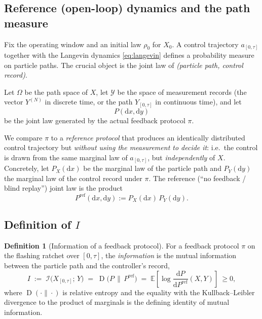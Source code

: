 \documentclass{amsart}
\theoremstyle{definition}
\newtheorem{definition}{Definition}
\newcommand{\E}{\mathbb{E}}
\newcommand{\dd}{\mathrm{d}}
\DeclareMathOperator{\KL}{D}
\begin{document}
\subsection{Reference (open-loop) dynamics and the path measure}
Fix the operating window and an initial law $\rho_0$ for $X_0$. A control
trajectory $a_{[0,\tau]}$ together with the Langevin dynamics
\eqref{eq:langevin} defines a probability measure on particle paths. The
crucial object is the joint law of \emph{(particle path, control record)}.

Let $\Omega$ be the path space of $X$, let $\mathcal Y$ be the space of
measurement records (the vector $Y^{(N)}$ in discrete time, or the path
$Y_{[0,\tau]}$ in continuous time), and let
\[
P(\dd x,\dd y)
\]
be the joint law generated by the actual feedback protocol $\pi$.

We compare $\pi$ to a \emph{reference protocol} that produces an identically
distributed control trajectory but \emph{without using the measurement to
decide it}: i.e.\ the control is drawn from the same marginal law of
$a_{[0,\tau]}$, but \emph{independently} of $X$. Concretely, let
$P_X(\dd x)$ be the marginal law of the particle path and $P_Y(\dd y)$ the
marginal law of the control record under $\pi$. The reference (``no
feedback / blind replay'') joint law is the product
\[
P^{\mathrm{ref}}(\dd x,\dd y) := P_X(\dd x)\,P_Y(\dd y).
\]

\subsection{Definition of $I$}

\begin{definition}[Information of a feedback protocol]\label{def:I}
For a feedback protocol $\pi$ on the flashing ratchet over $[0,\tau]$, the
\emph{information} is the mutual information between the particle path and the
controller's record,
\begin{equation}\label{eq:Idef}
I \;:=\; \mathcal I\!\bigl(X_{[0,\tau]};\,Y\bigr)
\;=\; \KL\!\bigl(P \,\big\|\, P^{\mathrm{ref}}\bigr)
\;=\; \E\!\left[\log\frac{\dd P}{\dd P^{\mathrm{ref}}}(X,Y)\right]\ \ge 0,
\end{equation}
where $\KL(\cdot\|\cdot)$ is relative entropy and the equality with the
Kullback--Leibler divergence to the product of marginals is the defining
identity of mutual information.
\end{definition}
\end{document}

